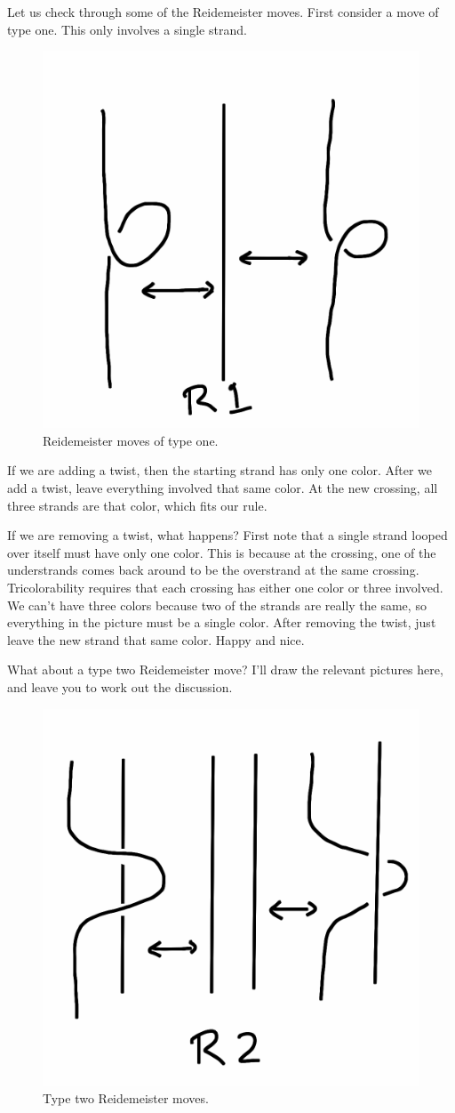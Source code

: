 \documentclass[12pt,letterpaper]{article}
\theoremstyle{definition}
\begin{document}
Let us check through some of the Reidemeister moves.
First consider a move of type one. 
This only involves a single strand. 

\begin{figure}[h]
    \centering
    \includegraphics[width=.3\textwidth]{rgp08pics/r1.png}
    \caption{Reidemeister moves of type one.}
\end{figure}

If we are adding a twist, then the starting strand has only one color.
After we add a twist, leave everything involved that same color.
At the new crossing, all three strands are that color, which fits our rule.



If we are removing a twist, what happens? 
First note that a single strand looped over itself must have only one color. This is because at the crossing, one of the understrands comes back around to be the overstrand at the same crossing.
Tricolorability requires that each crossing has either one color or three involved. 
We can't have three colors because two of the strands are really the same, so everything in the picture must be a single color. 
After removing the twist, just leave the new strand that same color.
Happy and nice.


What about a type two Reidemeister move? 
I'll draw the relevant pictures here, and leave you to work out the discussion.

\begin{figure}[h]
    \centering
    \includegraphics[width=.4\textwidth]{rgp08pics/r2.png}
    \caption{Type two Reidemeister moves.}
\end{figure}
\end{document}
